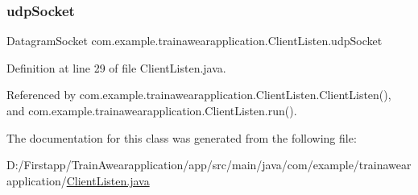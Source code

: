 \subsubsection{\texorpdfstring{udpSocket}{udpSocket}}
{\footnotesize\ttfamily Datagram\+Socket com.\+example.\+trainawearapplication.\+Client\+Listen.\+udp\+Socket\hspace{0.3cm}{\ttfamily [private]}}



Definition at line 29 of file Client\+Listen.\+java.



Referenced by com.\+example.\+trainawearapplication.\+Client\+Listen.\+Client\+Listen(), and com.\+example.\+trainawearapplication.\+Client\+Listen.\+run().



The documentation for this class was generated from the following file\+:\begin{DoxyCompactItemize}
\item 
D\+:/\+Firstapp/\+Train\+Awearapplication/app/src/main/java/com/example/trainawearapplication/\mbox{\hyperlink{_client_listen_8java}{Client\+Listen.\+java}}\end{DoxyCompactItemize}
